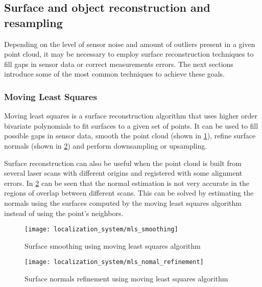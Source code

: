 \subsection{Surface and object reconstruction and resampling}

Depending on the level of sensor noise and amount of outliers present in a given point cloud, it may be necessary to employ surface reconstruction techniques to fill gaps in sensor data or correct measurements errors. The next sections introduce some of the most common techniques to achieve these goals.


\subsubsection{Moving Least Squares}\label{sec:point-cloud-algorithms_mls}

Moving least squares \cite{Alexa2003} is a surface reconstruction algorithm that uses higher order bivariate polynomials to fit surfaces to a given set of points. It can be used to fill possible gaps in sensor data, smooth the point cloud (shown in \cref{fig:point-cloud-algorithms_mls-smoothing}), refine surface normals (shown in \cref{fig:point-cloud-algorithms_mls-nomal-refinement}) and perform downsampling or upsampling.

Surface reconstruction can also be useful when the point cloud is built from several laser scans with different origins and registered with some alignment errors. In \cref{fig:point-cloud-algorithms_mls-nomal-refinement} can be seen that the normal estimation is not very accurate in the regions of overlap between different scans. This can be solved by estimating the normals using the surfaces computed by the moving least squares algorithm instead of using the point's neighbors.


\begin{figure}[H]
	\centering
	\texttt{[image: localization\_system/mls\_smoothing]}
	\caption[Surface smoothing using moving least squares algorithm]{Surface smoothing using moving least squares algorithm\protect\footnotemark}
	\label{fig:point-cloud-algorithms_mls-smoothing}
\end{figure}

\begin{figure}[H]
	\centering
	\texttt{[image: localization\_system/mls\_nomal\_refinement]}
	\caption[Surface normals refinement using moving least squares algorithm]{Surface normals refinement using moving least squares algorithm \cite{Rusu2010a}}
	\label{fig:point-cloud-algorithms_mls-nomal-refinement}
\end{figure}



